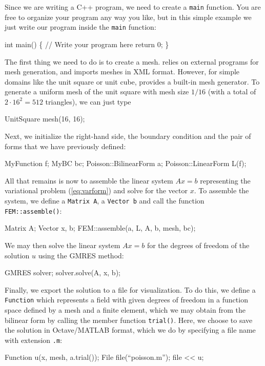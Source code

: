 Since we are writing a C++ program, we need to create a \texttt{main}
function.  You are free to organize your program any way you like, but
in this simple example we just write our program inside the
\texttt{main} function:

\begin{code}
  int main()
  \{
    // Write your program here
    return 0;
  \}
\end{code}

The first thing we need to do is to create a mesh. \dolfin{} relies on
external programs for mesh generation, and imports meshes in \dolfin{}
XML format. However, for simple domains like the unit square or unit
cube, \dolfin{} provides a built-in mesh generator. To generate a
uniform mesh of the unit square with mesh size $1/16$ (with a total of
$2\cdot 16^2 = 512$ triangles), we can just type
\begin{code}
  UnitSquare mesh(16, 16);
\end{code}

Next, we initialize the right-hand side, the boundary condition and
the pair of forms that we have previously defined:
\begin{code}
  MyFunction f;
  MyBC bc;
  Poisson::BilinearForm a;
  Poisson::LinearForm L(f);
\end{code}

All that remains is now to assemble the linear system $A x = b$
representing the variational problem (\ref{eq:varform}) and solve for
the vector $x$. To assemble the system, we define a \texttt{Matrix~A},
a \texttt{Vector~b} and call the function \texttt{FEM::assemble()}:
\begin{code}
  Matrix A;
  Vector x, b;
  FEM::assemble(a, L, A, b, mesh, bc);
\end{code}
We may then solve the linear system $A x = b$ for the degrees of
freedom of the solution $u$ using the GMRES method:
\begin{code}
  GMRES solver;
  solver.solve(A, x, b);
\end{code}

Finally, we export the solution to a file for visualization. To do
this, we define a \texttt{Function} which represents a field with
given degrees of freedom in a function space defined by a mesh and a
finite element, which we may obtain from the bilinear form by calling
the member function \texttt{trial()}. Here, we choose to save the
solution in Octave/MATLAB format, which we do by specifying a file
name with extension \texttt{.m}:
\begin{code}
  Function u(x, mesh, a.trial());
  File file(``poisson.m'');
  file << u;
\end{code}


